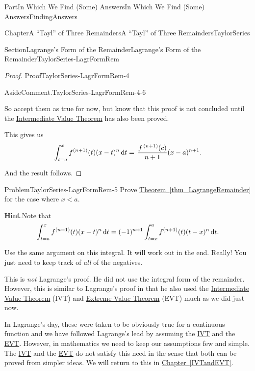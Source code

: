 \documentclass[oneside,10pt,]{book}
\newcommand{\blocktitlefont}{\relax}
\newcommand{\xreffont}{\relax}
\numberwithin{equation}{part}
\newcommand{\dx}[1]{\,{\rm d}#1}
\newcommand{\lt}{<}
\begin{document}
\begin{partptx}{Part}{In Which We Find (Some) Answers}{}{In Which We Find (Some) Answers}{}{}{FindingAnswers}
\begin{chapterptx}{Chapter}{A ``Tayl'' of Three Remainders}{}{A ``Tayl'' of Three Remainders}{}{}{TaylorSeries}
\begin{sectionptx}{Section}{Lagrange's Form of the Remainder}{}{Lagrange's Form of the Remainder}{}{}{TaylorSeries-LagrFormRem}
\begin{proof}{Proof}{}{TaylorSeries-LagrFormRem-4}
\begin{aside}{Aside}{Comment.}{TaylorSeries-LagrFormRem-4-6}
\par
So accept them as true for now, but know that this proof is not concluded until the \hyperref[IntermediateValueTheorem]{Intermediate Value Theorem} has also been proved.%
\end{aside}
This gives us%
\begin{equation*}
\int_{t=a}^xf^{(n+1)}(t)(x-t)^n\dx{ t}=\,\frac{f^{\,(n+1)}(c)}{n+1}(x-a)^{n+1}\text{.}
\end{equation*}
%
\par
And the result follows.%
\end{proof}
\begin{problem}{Problem}{}{TaylorSeries-LagrFormRem-5}%
\index{Lagrange's form of the remainder!\(x\lt a\)} Prove \hyperref[thm_LagrangeRemainder]{Theorem~{\xreffont\ref{thm_LagrangeRemainder}}} for the case where \(x\lt a\).%
\par\smallskip%
\noindent\textbf{\blocktitlefont Hint}.\hypertarget{TaylorSeries-LagrFormRem-5-2}{}\quad{}Note that%
\begin{equation*}
\int_{t=a}^xf^{(n+1)}(t)(x-t)^n\dx{ t}=(-1)^{n+1}\int_{t=x}^af^{(n+1)}(t)(t-x)^n\dx{ t}\text{.}
\end{equation*}
%
\par
Use the same argument on this integral.  It will work out in the end.  Really!  You just need to keep track of \emph{all} of the negatives.%
\end{problem}
 This is \emph{not} Lagrange's proof.  He did not use the integral form of the remainder.  However, this is similar to Lagrange's proof in that he also used the \hyperref[IntermediateValueTheorem]{Intermediate Value Theorem} (IVT) and \hyperref[thm_EVT]{Extreme Value Theorem} (EVT) much as we did just now.%
\par
{} In Lagrange's day, these were taken to be obviously true for a continuous function and we have followed Lagrange's lead by assuming the \hyperref[IntermediateValueTheorem]{IVT} and the \hyperref[thm_EVT]{EVT}. However, in mathematics we need to keep our assumptions few and simple.  The \hyperref[IntermediateValueTheorem]{IVT} and the \hyperref[thm_EVT]{EVT} do not satisfy this need in the sense that both can be proved from simpler ideas. We will return to this in \hyperref[IVTandEVT]{Chapter~{\xreffont\ref{IVTandEVT}}}.%
\par

\end{sectionptx}
\end{chapterptx}
\end{partptx}
\end{document}
